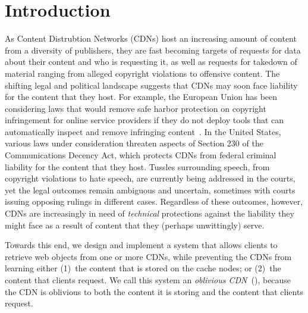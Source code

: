 \section{Introduction}
\label{sec:intro}


As Content Distrubtion Networks (CDNs) host an increasing amount of content
from a diversity of publishers, they are fast becoming targets of requests for
data about their content and who is requesting it, as well as requests for
takedown of material ranging from alleged copyright violations to offensive
content. The shifting legal and political landscape suggests that CDNs may
soon face liability for the content that they host. For example, the European
Union has been considering laws that would remove safe harbor protection on
copyright infringement for online service providers if they do not deploy
tools that can automatically inspect and remove infringing content~\cite{eu-copyright}.  
In the United States, various laws under consideration threaten
aspects of Section 230 of the Communications Decency Act, which protects CDNs
from federal criminal liability for the content that they host. Tussles
surrounding speech, from copyright violations to hate speech, are currently
being addressed in the courts, yet the legal outcomes remain ambiguous and
uncertain, sometimes with courts issuing opposing rulings in different cases.
Regardless of these outcomes, however, CDNs are increasingly in need of {\em technical}
protections against the liability they might face as a result of content that they
(perhaps unwittingly) serve.

Towards this end, we design and implement a system that allows clients to
retrieve web objects from one or more CDNs, while preventing the CDNs from
learning either (1)~the content that is stored on the cache nodes; or (2)~the
content that clients request. We call this system an {\em oblivious
CDN}~(\system{}), because the CDN is oblivious to both the content it is
storing and the content that clients request.


